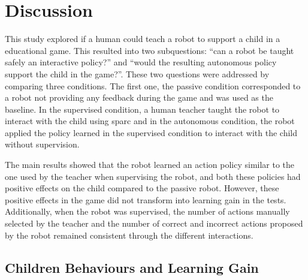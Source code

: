 %
%


\section{Discussion} \label{sec:tutoring_discussion}

This study explored if a human could teach a robot to support a child in a educational game. This resulted into two subquestions: ``can a robot be taught safely an interactive policy?'' and ``would the resulting autonomous policy support the child in the game?''. These two questions were addressed by comparing three conditions. The first one, the passive condition corresponded to a robot not providing any feedback during the game and was used as the baseline. In the supervised condition, a human teacher taught the robot to interact with the child using \gls{sparc} and in the autonomous condition, the robot applied the policy learned in the supervised condition to interact with the child without supervision.

The main results showed that the robot learned an action policy similar to the one used by the teacher when supervising the robot, and both these policies had positive effects on the child compared to the passive robot. However, these positive effects in the game did not transform into learning gain in the tests. Additionally, when the robot was supervised, the number of actions manually selected by the teacher and the number of correct and incorrect actions proposed by the robot remained consistent through the different interactions.

\subsection{Children Behaviours and Learning Gain}


